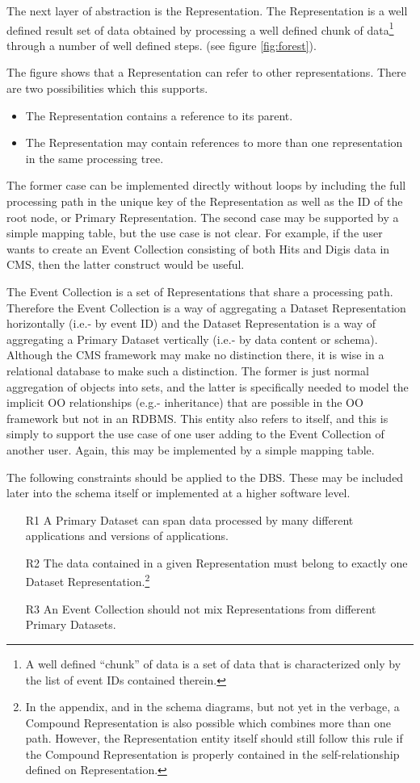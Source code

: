 \documentclass{cmspaper}
\begin{document}
The next layer of abstraction is the Representation.  The Representation is a 
well defined result set of data obtained by processing a well defined chunk
of data\footnote{A well defined ``chunk'' of data is a set of data that is 
characterized only by the list of event IDs contained therein.} through a 
number of well defined steps.  (see figure \ref{fig:forest}).

The figure shows that a Representation can refer to other representations.  There
are two possibilities which this supports.
\begin{itemize}
\item The Representation contains a reference to its parent. 
\item The Representation may contain references to more than one 
representation in the same processing tree.  
\end{itemize}
The former case can be implemented directly without loops by including the 
full processing path in the unique key of the Representation as well as the 
ID of the root node, or Primary Representation.  The second case may be
supported by a simple mapping table, but the use case is not clear.  For example, 
if the user wants to create an Event Collection consisting of both Hits and 
Digis data in CMS, then the latter construct would be useful.

The Event Collection is a set of Representations that share a processing path.  
Therefore the Event Collection is a way of aggregating a Dataset Representation 
horizontally (i.e.- by event ID) and the Dataset Representation is a way of 
aggregating a Primary Dataset vertically (i.e.- by data content or schema). 
Although the CMS framework may make no distinction there, it is wise in a 
relational database to make such a distinction.  The former is just normal aggregation
of objects into sets, and the latter is specifically needed to model the implicit
OO relationships (e.g.- inheritance) that are possible in the OO framework
but not in an RDBMS. This entity also refers to itself, and this is simply to support
the use case of one user adding to the Event Collection of another user.  Again, this
may be implemented by a simple mapping table.

The following constraints should be applied to the DBS.  These may be included 
later into the schema itself or implemented at a higher software level.
\begin{itemize}
\item[R1]  A Primary Dataset can span data processed by many 
different applications and versions of applications.  
\item[R2] The data contained in a given Representation must 
belong to exactly one Dataset Representation.\footnote{In the appendix, 
and in the schema diagrams, but not yet in the verbage, a Compound 
Representation is also possible which combines more than one path.
However, the Representation entity itself should still follow 
this rule if the Compound Representation is properly contained in the 
self-relationship defined on Representation.}  
\item[R3] An Event Collection should not mix Representations from different 
Primary Datasets.
\end{itemize}
\end{document}
